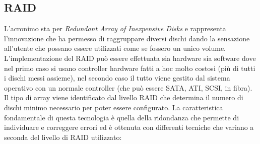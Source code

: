 \subsection{RAID}
L'acronimo sta per \textit{Redundant Array of Inexpensive Disks} e rappresenta l'innovazione che ha permesso di raggruppare diversi dischi dando la sensazione all'utente che possano essere utilizzati come se fossero un unico volume. L'implementazione del RAID può essere effettuata sia hardware sia software dove nel primo caso si usano controller hardware fatti a hoc molto costosi (più di tutti i dischi messi assieme), nel secondo caso il tutto viene gestito dal sistema operativo con un normale controller (che può essere SATA, ATI, SCSI, in fibra). Il tipo di array viene identificato dal livello RAID che determina il numero di dischi minimo necessario per poter essere configurato. La caratteristica fondamentale di questa tecnologia è quella della ridondanza che permette di individuare e correggere errori ed è ottenuta con differenti tecniche che variano a seconda del livello di RAID utilizzato:
